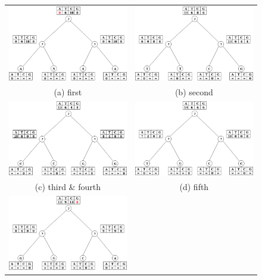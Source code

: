 \documentclass[]{article}
\theoremstyle{definition}
\begin{document}
\begin{figure}[h!]
	\begin{tabular}{cc}
			\includegraphics*[width = 65mm]{image/tree_1.png} &   \includegraphics*[width = 65mm]{image/tree_2.png} \\
		(a) first & (b) second \\[6pt]
		\includegraphics*[width = 65mm]{image/tree_3-4.png} &   \includegraphics*[width = 65mm]{image/tree_5.png} \\
		(c) third \& fourth & (d) fifth \\[6pt]
		\includegraphics*[width = 65mm]{image/tree_6.png}&

\end{tabular}
\end{figure}
\end{document}

